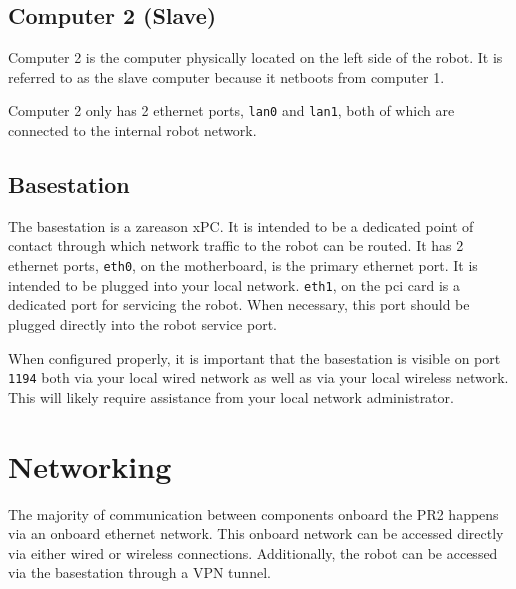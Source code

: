 \subsection{Computer 2 (Slave)}
Computer 2 is the computer physically located on the left side of the
robot. It is referred to as the slave computer because it netboots
from computer 1.

Computer 2 only has 2 ethernet ports, \texttt{lan0} and \texttt{lan1},
both of which are connected to the internal robot network.

\subsection{Basestation}
The basestation is a zareason xPC.  It is intended to be a dedicated
point of contact through which network traffic to the robot can be
routed.  It has 2 ethernet ports, \texttt{eth0}, on the motherboard,
is the primary ethernet port.  It is intended to be plugged into your
local network.  \texttt{eth1}, on the pci card is a dedicated port for
servicing the robot.  When necessary, this port should be plugged
directly into the robot service port.

When configured properly, it is important that the basestation is
visible on port \texttt{1194} both via your local wired network as
well as via your local wireless network.  This will likely require
assistance from your local network administrator.

\section{Networking}
The majority of communication between components onboard the PR2
happens via an onboard ethernet network.  This onboard network can be
accessed directly via either wired or wireless connections.
Additionally, the robot can be accessed via the basestation through a
VPN tunnel.

